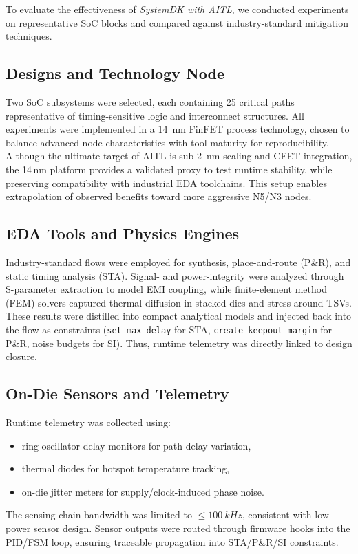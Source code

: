 \documentclass[conference]{IEEEtran}
\begin{document}
To evaluate the effectiveness of \emph{SystemDK with AITL}, we conducted experiments on representative SoC blocks and compared against industry-standard mitigation techniques.

\subsection{Designs and Technology Node}
Two SoC subsystems were selected, each containing 25 critical paths representative of timing-sensitive logic and interconnect structures.  
All experiments were implemented in a \SI{14}{\nano\meter} FinFET process technology, chosen to balance advanced-node characteristics with tool maturity for reproducibility.  
Although the ultimate target of AITL is sub-\SI{2}{\nano\meter} scaling and CFET integration, the 14\,nm platform provides a validated proxy to test runtime stability, while preserving compatibility with industrial EDA toolchains. This setup enables extrapolation of observed benefits toward more aggressive N5/N3 nodes.

\subsection{EDA Tools and Physics Engines}
Industry-standard flows were employed for synthesis, place-and-route (P\&R), and static timing analysis (STA).  
Signal- and power-integrity were analyzed through S-parameter extraction to model EMI coupling, while finite-element method (FEM) solvers captured thermal diffusion in stacked dies and stress around TSVs.  
These results were distilled into compact analytical models and injected back into the flow as constraints (\texttt{set\_max\_delay} for STA, \texttt{create\_keepout\_margin} for P\&R, noise budgets for SI). Thus, runtime telemetry was directly linked to design closure.

\subsection{On-Die Sensors and Telemetry}
Runtime telemetry was collected using:
\begin{itemize}
  \item ring-oscillator delay monitors for path-delay variation,
  \item thermal diodes for hotspot temperature tracking,
  \item on-die jitter meters for supply/clock-induced phase noise.
\end{itemize}
The sensing chain bandwidth was limited to $\leq \SI{100}{kHz}$, consistent with low-power sensor design. Sensor outputs were routed through firmware hooks into the PID/FSM loop, ensuring traceable propagation into STA/P\&R/SI constraints.
\end{document}
